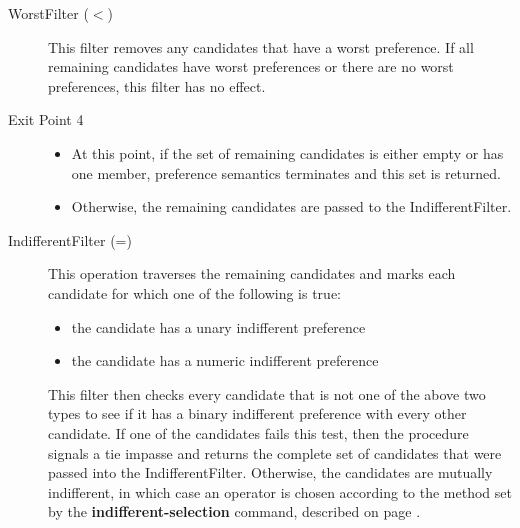 \begin{description}
\item[WorstFilter ($<$) ] This filter removes any candidates that have
	a worst preference. If all remaining candidates have worst preferences or there
	are no worst preferences, this filter has no effect.

\item[Exit Point 4]
	\begin{itemize}
	\item At this point, if the set of remaining candidates is either empty or has one
	member, preference semantics terminates and this set is returned.
	\item Otherwise, the remaining candidates are passed to the
	IndifferentFilter.
	\end{itemize}
\index{-}

\index{=}
\item[IndifferentFilter (=) ] This operation traverses the remaining candidates and marks 
	each candidate for which one of the following is true:
	\begin{itemize}
	\item the candidate has a unary indifferent preference
	\item the candidate has a numeric indifferent preference
	\end{itemize}
	This filter then checks every candidate that is not one of the above two types
	to see if it has a binary indifferent preference with every other candidate.
	If one of the candidates fails this test, then the procedure signals a tie impasse
	and returns the complete set of candidates that were passed into the 
	IndifferentFilter. Otherwise, the candidates are mutually indifferent, in which case 
	an operator is chosen according to the method set by the 
	\textbf{indifferent-selection} command, described on 
	page \pageref{indifferent-selection}.
\end{description}

